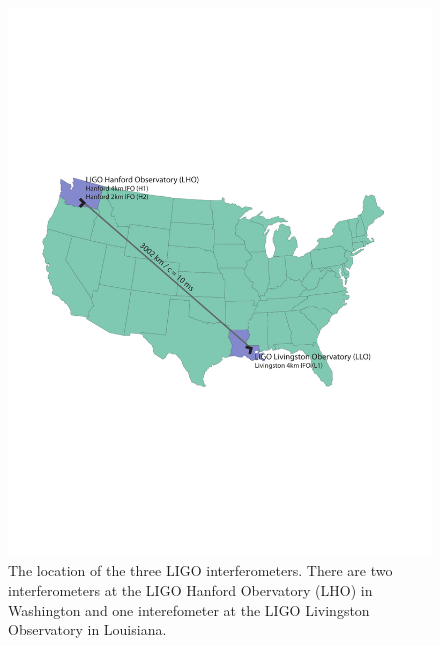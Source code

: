 \begin{figure}[p]
\label{f:usmap}
\begin{center}
\includegraphics[width=\linewidth]{figures/inspiral/observatories}
\end{center}
\caption[Location of LIGO Interferometers]{%
The location of the three LIGO interferometers. There are two interferometers
at the LIGO Hanford Obervatory (LHO) in Washington and one interefometer at
the LIGO Livingston Observatory in Louisiana.
}
\end{figure}

